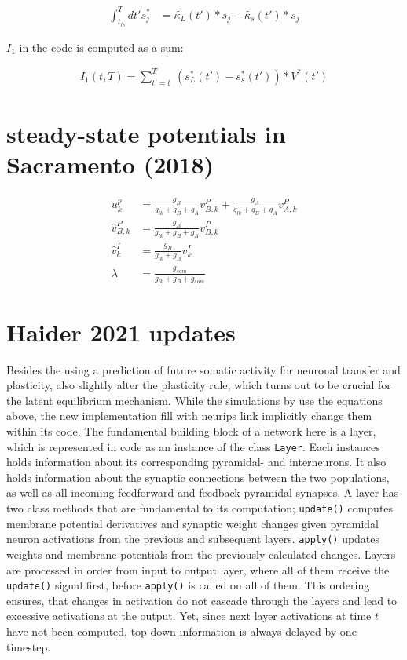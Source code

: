 \begin{align}
  \int_{t_{ls}}^T dt' s_j^* & =  \tilde{\kappa_L}(t') * s_j -  \tilde{\kappa_s}(t') * s_j
\end{align}

$I_1$ in the code is computed as a sum:

\begin{align}
  I_1 (t,T) = \sum_{t'=t}^T \ (s_L^*(t') - s_s^*(t')) * V^*(t')
\end{align}


\section{steady-state potentials in Sacramento (2018)}

\begin{align}
  u_k^p           & = \frac{g_B}{g_{lk} + g_B + g_A} v^P_{B,k} + \frac{g_A}{g_{lk} + g_B + g_A} v^P_{A,k} \\
  \hat{v}^P_{B,k} & = \frac{g_B}{g_{lk} + g_B + g_A} v^P_{B,k}                                            \\
  \hat{v}^I_{k}   & = \frac{g_B}{g_{lk} + g_B} v^I_{k}                                                    \\
  \lambda         & = \frac{g_{som}}{g_{lk} + g_B + g_{som}}
\end{align}



\section{Haider 2021 updates}

Besides the using a prediction of future somatic activity for neuronal transfer and plasticity, \cite{Haider2021} also
slightly alter the plasticity rule, which turns out to be crucial for the latent equilibrium mechanism. While the
simulations by \cite{sacramento2018dendritic} use the equations above, the new implementation \href{https://github.com/neurips}{fill with neurips link}
implicitly change them within its code. The fundamental building block of a network here is a layer, which is
represented in code as an instance of the class \texttt{Layer}. Each instances holds information about its corresponding
pyramidal- and interneurons. It also holds information about the synaptic connections between the two populations, as
well as all incoming feedforward and feedback pyramidal synapses. A layer has two class methods that are fundamental
to its computation; \texttt{update()} computes membrane potential derivatives and synaptic weight changes given pyramidal
neuron activations from the previous and subsequent layers. \texttt{apply()} updates weights and membrane potentials
from the previously calculated changes. Layers are processed in order from input to output layer, where all of them
receive the \texttt{update()} signal first, before \texttt{apply()} is called on all of them. This ordering ensures,
that changes in activation do not cascade through the layers and lead to excessive activations at the output. Yet,
since next layer activations at time $t$ have not been computed, top down information is always delayed by one timestep.


